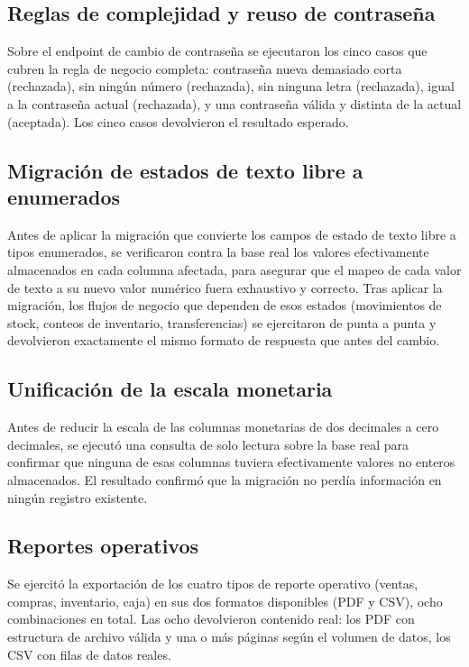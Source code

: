 \subsection{Reglas de complejidad y reuso de contraseña}
\label{sec:validacion-password}

Sobre el endpoint de cambio de contraseña se ejecutaron los cinco casos que cubren la regla de negocio completa: contraseña nueva demasiado corta (rechazada), sin ningún número (rechazada), sin ninguna letra (rechazada), igual a la contraseña actual (rechazada), y una contraseña válida y distinta de la actual (aceptada). Los cinco casos devolvieron el resultado esperado.

\subsection{Migración de estados de texto libre a enumerados}
\label{sec:validacion-enums}

Antes de aplicar la migración que convierte los campos de estado de texto libre a tipos enumerados, se verificaron contra la base real los valores efectivamente almacenados en cada columna afectada, para asegurar que el mapeo de cada valor de texto a su nuevo valor numérico fuera exhaustivo y correcto. Tras aplicar la migración, los flujos de negocio que dependen de esos estados (movimientos de stock, conteos de inventario, transferencias) se ejercitaron de punta a punta y devolvieron exactamente el mismo formato de respuesta que antes del cambio.

\subsection{Unificación de la escala monetaria}
\label{sec:validacion-monetaria}

Antes de reducir la escala de las columnas monetarias de dos decimales a cero decimales, se ejecutó una consulta de solo lectura sobre la base real para confirmar que ninguna de esas columnas tuviera efectivamente valores no enteros almacenados. El resultado confirmó que la migración no perdía información en ningún registro existente.

\subsection{Reportes operativos}
\label{sec:validacion-reportes}

Se ejercitó la exportación de los cuatro tipos de reporte operativo (ventas, compras, inventario, caja) en sus dos formatos disponibles (PDF y CSV), ocho combinaciones en total. Las ocho devolvieron contenido real: los PDF con estructura de archivo válida y una o más páginas según el volumen de datos, los CSV con filas de datos reales.

